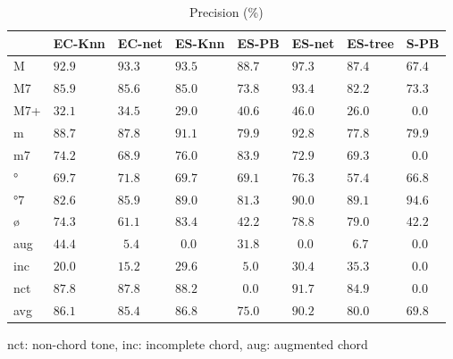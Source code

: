 \documentclass{article}
\begin{document}
\begin{table}
  \centering
  \begin{tabular}{l|p{.5cm}p{.5cm}p{.5cm}p{.5cm}p{.5cm}p{.5cm}p{.5cm}}
   & EC-Knn&EC-net &ES-Knn &ES-PB  &ES-net &ES-tree&S-PB     \\
\hline                                             
M  &$ 92.9$&$ 93.3$&$ 93.5$&$ 88.7$&$ 97.3$&$ 87.4$&$ 67.4$  \\
M7 &$ 85.9$&$ 85.6$&$ 85.0$&$ 73.8$&$ 93.4$&$ 82.2$&$ 73.3$  \\
M7+&$ 32.1$&$ 34.5$&$ 29.0$&$ 40.6$&$ 46.0$&$ 26.0$&$~~0.0$  \\
m  &$ 88.7$&$ 87.8$&$ 91.1$&$ 79.9$&$ 92.8$&$ 77.8$&$ 79.9$  \\
m7 &$ 74.2$&$ 68.9$&$ 76.0$&$ 83.9$&$ 72.9$&$ 69.3$&$~~0.0$  \\
°  &$ 69.7$&$ 71.8$&$ 69.7$&$ 69.1$&$ 76.3$&$ 57.4$&$ 66.8$  \\
°7 &$ 82.6$&$ 85.9$&$ 89.0$&$ 81.3$&$ 90.0$&$ 89.1$&$ 94.6$  \\
ø  &$ 74.3$&$ 61.1$&$ 83.4$&$ 42.2$&$ 78.8$&$ 79.0$&$ 42.2$  \\
aug&$ 44.4$&$~~5.4$&$~~0.0$&$ 31.8$&$~~0.0$&$~~6.7$&$~~0.0$  \\
inc&$ 20.0$&$ 15.2$&$ 29.6$&$~~5.0$&$ 30.4$&$ 35.3$&$~~0.0$  \\
nct&$ 87.8$&$ 87.8$&$ 88.2$&$~~0.0$&$ 91.7$&$ 84.9$&$~~0.0$  \\
avg&$ 86.1$&$ 85.4$&$ 86.8$&$ 75.0$&$ 90.2$&$ 80.0$&$ 69.8$  \\

  \end{tabular}

\medskip

nct: non-chord tone, inc: incomplete chord, aug: augmented chord

  \caption{Precision (\%)}
  \label{tab:precision}
\end{table}
\end{document}
